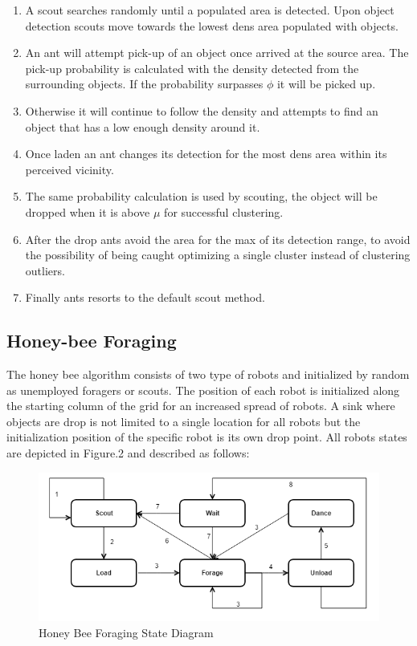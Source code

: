 \documentclass[12pt]{article}
\begin{document}
\begin{enumerate}[nolistsep]
\item A scout searches randomly until a populated area is detected. Upon object detection scouts move towards the lowest dens area populated with objects.
\item An ant will attempt pick-up of an object once arrived at the source area. The pick-up probability is calculated with the density detected from the surrounding objects. If the probability surpasses $\phi$ it will be picked up.
\item Otherwise it will continue to follow the density and attempts to find an object that has a low enough density around it.
\item Once laden an ant changes its detection for the most dens area within its perceived vicinity.
\item The same probability calculation is used by scouting, the object will be dropped when it is above $\mu$ for successful clustering.
\item After the drop ants avoid the area for the max of its detection range, to avoid the possibility of being caught optimizing a single cluster instead of clustering outliers.
\item Finally ants resorts to the default scout method.
\end{enumerate}

\subsection{Honey-bee Foraging}

\par{The honey bee algorithm consists of two type of robots and initialized by random as unemployed foragers or scouts. The position of each robot is initialized along the starting column of the grid for an increased spread of robots. A sink where objects are drop is not limited to a single location for all robots but the initialization position of the specific robot is its own drop point. All robots states are depicted in Figure.2 and described as follows:}

\begin{figure}[h]
\includegraphics[width=\textwidth]{honeybee.png}
\centering
\caption{Honey Bee Foraging State Diagram}
\label{fig:honeyBeeState}
\end{figure}
\end{document}
